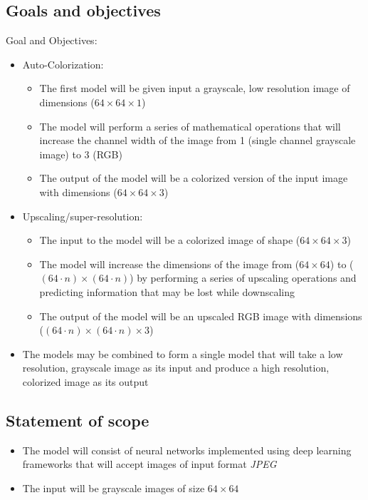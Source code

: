 \documentclass[oneside,a4paper,12pt]{report}
\begin{document}
\subsection{Goals and objectives}
Goal and Objectives:
\begin{itemize}
\item Auto-Colorization:
	\begin{itemize}
		\item The first model will be given input a grayscale, low resolution image of dimensions ($64\times 64\times 1$)
  		\item The model will perform a series of mathematical operations that will increase the channel width of the image from 1 (single channel grayscale image) to 3 (RGB)
  		\item The output of the model will be a colorized version of the input image with dimensions ($64\times 64\times 3$)
	\end{itemize}
\item Upscaling/super-resolution:
  	\begin{itemize}
  		\item The input to the model will be a colorized image of shape ($64\times 64\times 3$)
  		\item The model will increase the dimensions of the image from ($64\times 64$) to ($(64\cdot n)\times (64\cdot n)$) by performing a series of upscaling operations and predicting information that may be lost while downscaling
  		\item The output of the model will be an upscaled RGB image with dimensions ($(64\cdot n)\times (64\cdot n)\times 3$)
  	\end{itemize}
  	\item The models may be combined to form a single model that will take a low resolution, grayscale image as its input and produce a high resolution, colorized image as its output
\end{itemize}


 \subsection{Statement of scope}
	\begin{itemize}
	\item The model will consist of neural networks implemented using deep learning frameworks that will accept images of input format \textit{JPEG}
	\item The input will be grayscale images of size $64\times 64$
	\end{itemize}
\end{document}
